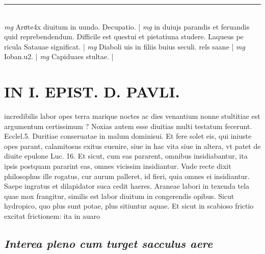 \documentclass{article}
\begin{document}
\begin{pages}
\vspace{0.5cm}\noindent
\vspace{0.2cm}\rule{1cm}{0.2pt}\\ 
\hspace{0.2cm}\textit{mg}
\footnotesize Arσte4x diuitum in uundo. Decupatio. 
\normalsize| 
\hspace{0.2cm}\textit{mg}
\footnotesize in duiujs parandis et feruandis quid reprebendendum. Difficile est questui et pietatiuna studere. Laqueus pe ricula Satauae significat. 
\normalsize| 
\hspace{0.2cm}\textit{mg}
\footnotesize Diaboli uis in filiis buius seculi. rels saane
\normalsize| 
\hspace{0.2cm}\textit{mg}
\footnotesize Ioban.u2. 
\normalsize| 
\hspace{0.2cm}\textit{mg}
\footnotesize Capiduaes stultae. 
\normalsize| 
\section*{IN I. EPIST. D. PAVLI. }
\marginpar{[ p.127 ]}\pstart incredibilis labor opes terra marique noctes ac dies venantium nonne stultitiae est argumentum certissimum ? Noxias autem esse diuitias multi testatum fecerunt. Ecclel.5. Duritiae conseruatae in malum dominisui. Et fere solet eis, qui iniuste opes parant, calamitosus exitus euenire, siue in hac vita siue in altera, vt patet de diuite epulone Luc. 16. Et sicut, cum eas pararent, omnibus insidiabantur, ita ipsis postquam pararint eas, omnes vicissim insidiantur. Vnde recte dixit philosophus ille rogatus, cur aurum palleret, id fieri, quia omnes ei insidiantur. Saepe ingratus et dilapidator suca cedit haeres. Araneae labori in texenda tela quae mox frangitur, similis est labor diuitum in congerendis opibus. Sicut hydropico, quo plus sunt potae, plus sitiuntur aquae. Et sicut in scabioso frictio excitat frictionem: ita in auaro  \pend
{}
{}
\subsection*{\textit{Interea pleno cum turget sacculus aere }}
{}

\end{pages}
\end{document}
